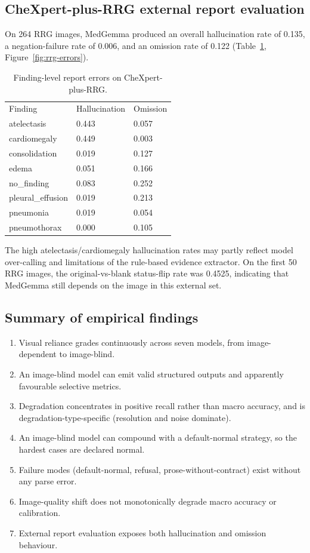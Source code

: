 \subsection{CheXpert-plus-RRG external report evaluation}

On 264 RRG images, MedGemma produced an overall hallucination rate of 0.135, a
negation-failure rate of 0.006, and an omission rate of 0.122
(Table~\ref{tab:rrg}, Figure~\ref{fig:rrg-errors}).

\begin{table}[t]
\centering
\small
\begin{tabular}{lll}
\hline
Finding & Hallucination & Omission \\
atelectasis & 0.443 & 0.057 \\
cardiomegaly & 0.449 & 0.003 \\
consolidation & 0.019 & 0.127 \\
edema & 0.051 & 0.166 \\
no\_finding & 0.083 & 0.252 \\
pleural\_effusion & 0.019 & 0.213 \\
pneumonia & 0.019 & 0.054 \\
pneumothorax & 0.000 & 0.105 \\
\hline
\end{tabular}
\caption{Finding-level report errors on CheXpert-plus-RRG.}
\label{tab:rrg}
\end{table}

The high atelectasis/cardiomegaly hallucination rates may partly reflect model
over-calling and limitations of the rule-based evidence extractor. On the first
50 RRG images, the original-vs-blank status-flip rate was 0.4525, indicating that
MedGemma still depends on the image in this external set.

\subsection{Summary of empirical findings}

\begin{enumerate}
\item Visual reliance grades continuously across seven models, from image-dependent to image-blind.
\item An image-blind model can emit valid structured outputs and apparently favourable selective metrics.
\item Degradation concentrates in positive recall rather than macro accuracy, and is degradation-type-specific (resolution and noise dominate).
\item An image-blind model can compound with a default-normal strategy, so the hardest cases are declared normal.
\item Failure modes (default-normal, refusal, prose-without-contract) exist without any parse error.
\item Image-quality shift does not monotonically degrade macro accuracy or calibration.
\item External report evaluation exposes both hallucination and omission behaviour.
\end{enumerate}